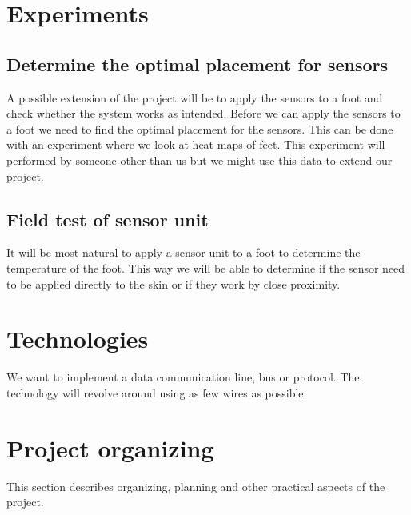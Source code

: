 \section{Experiments}
\subsection{Determine the optimal placement for sensors}
A possible extension of the project will be to apply the sensors to a foot and check whether the system works as intended. Before we can apply the sensors to a foot we need to find the optimal placement for the sensors. This can be done with an experiment where we look at heat maps of feet. This experiment will performed by someone other than us but we might use this data to extend our project.

\subsection{Field test of sensor unit}
It will be most natural to apply a sensor unit to a foot to determine the temperature of the foot. This way we will be able to determine if the sensor need to be applied directly to the skin or if they work by close proximity. 

\section{Technologies}
We want to implement a data communication line, bus or protocol. The technology will revolve around using as few wires as possible. 

\section{Project organizing}
This section describes organizing, planning and other practical aspects of the project.

